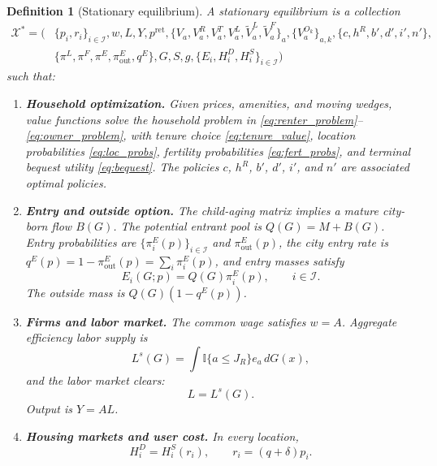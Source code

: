 \documentclass[11pt]{article}
\newtheorem{definition}{Definition}
\newcommand{\ind}{\mathbb{I}}
\newcommand{\Iset}{\mathcal I}
\begin{document}
\begin{definition}[Stationary equilibrium]
A stationary equilibrium is a collection
\begin{equation*}
\begin{aligned}
\mathcal X^\ast=\big(&
\{p_i,r_i\}_{i\in\Iset},w,L,Y,p^{\mathrm{ret}},
\{V_a,V^R_a,V^T_a,V^L_a,\widetilde V^L_a,\widetilde V^F_a\}_{a},
\{V^{O_k}_a\}_{a,k},
\{c,h^R,b',d',i',n'\},\\
&\{\pi^L,\pi^F,\pi^E,\pi_{\mathrm{out}}^E,q^E\},
G,S,g,
\{E_i,H_i^D,H_i^S\}_{i\in\Iset}
\big)
\end{aligned}
\end{equation*}
such that:
\begin{enumerate}[leftmargin=*]
    \item \textbf{Household optimization.} Given prices, amenities, and moving wedges, value functions solve the household problem in \eqref{eq:renter_problem}--\eqref{eq:owner_problem}, with tenure choice \eqref{eq:tenure_value}, location probabilities \eqref{eq:loc_probs}, fertility probabilities \eqref{eq:fert_probs}, and terminal bequest utility \eqref{eq:bequest}. The policies $c$, $h^R$, $b'$, $d'$, $i'$, and $n'$ are associated optimal policies.

    \item \textbf{Entry and outside option.} The child-aging matrix implies a mature city-born flow $B(G)$. The potential entrant pool is $Q(G)=M+B(G)$. Entry probabilities are $\{\pi_i^E(p)\}_{i\in\Iset}$ and $\pi_{\mathrm{out}}^E(p)$, the city entry rate is $q^E(p)=1-\pi_{\mathrm{out}}^E(p)=\sum_i\pi_i^E(p)$, and entry masses satisfy
    \begin{equation*}
        E_i(G;p)=Q(G)\pi_i^E(p),\qquad i\in\Iset.
    \end{equation*}
    The outside mass is $Q(G)(1-q^E(p))$.

    \item \textbf{Firms and labor market.} The common wage satisfies $w=A$. Aggregate efficiency labor supply is
    \begin{equation*}
        L^s(G)=\int \ind\{a\leq J_R\}e_a\,dG(x),
    \end{equation*}
    and the labor market clears:
    \begin{equation*}
        L=L^s(G).
    \end{equation*}
    Output is $Y=A L$.

    \item \textbf{Housing markets and user cost.} In every location,
    \begin{equation*}
        H_i^D=H_i^S(r_i),
        \qquad
        r_i=(q+\delta)p_i.
    \end{equation*}


\end{enumerate}
\end{definition}
\end{document}
